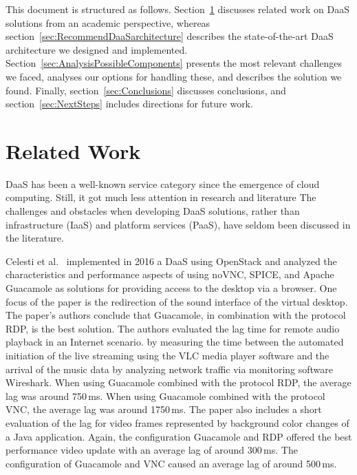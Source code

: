 \documentclass[runningheads]{llncs}
\begin{document}
This document is structured as follows. Section~\ref{sec:relatedworkAbschnitt} discusses related work on DaaS solutions from an academic perspective, whereas section~\ref{sec:RecommendDaaSarchitecture} describes the state-of-the-art DaaS architecture we designed and implemented. Section~\ref{sec:AnalysisPossibleComponents} presents the most relevant challenges we faced, analyses our options for handling these, and describes the solution we found. Finally, section~\ref{sec:Conclusions} discusses conclusions, and section~\ref{sec:NextSteps} includes directions for future work.



\section{Related Work}
\label{sec:relatedworkAbschnitt}


DaaS has been a well-known service category since the emergence of cloud computing. Still, it got much less attention in research and literature
The challenges and obstacles when developing DaaS solutions, rather than infrastructure (IaaS) and platform services (PaaS), have seldom been discussed in the literature.

Celesti et al.~\cite{celesti2016improving} implemented in 2016 a DaaS using OpenStack and analyzed the characteristics and performance aspects of using noVNC, SPICE, and Apache Guacamole as solutions for providing access to the desktop via a browser. One focus of the paper is the redirection of the sound interface of the virtual desktop. The paper's authors conclude that Guacamole, in combination with the protocol RDP, is the best solution. The authors evaluated the lag time for remote audio playback in an Internet scenario. by measuring the time between the automated initiation of the live streaming using the VLC media player software and the arrival of the music data by analyzing network traffic via monitoring software Wireshark. When using Guacamole combined with the protocol RDP, the average lag was around 750\,ms. When using Guacamole combined with the protocol VNC, the average lag was around 1750\,ms. The paper also includes a short evaluation of the lag for video frames represented by background color changes of a Java application. Again, the configuration Guacamole and RDP offered the best performance video update with an average lag of around 300\,ms. The configuration of Guacamole and VNC caused an average lag of around 500\,ms.
\end{document}
